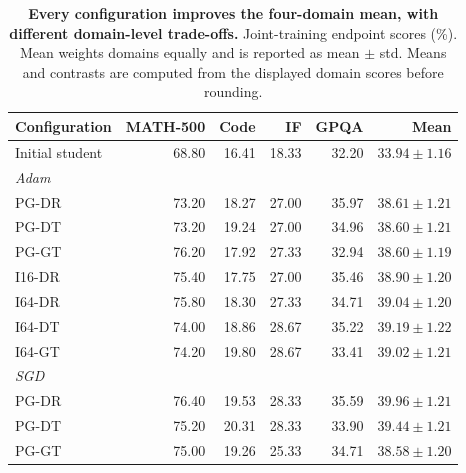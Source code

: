 \begin{table}[t]
\centering
\small
\setlength{\tabcolsep}{5pt}
\caption{\textbf{Every configuration improves the four-domain mean, with different domain-level trade-offs.} Joint-training endpoint scores (\%). Mean weights domains equally and is reported as mean $\pm$ std. Means and contrasts are computed from the displayed domain scores before rounding.}
\label{tab:completed_endpoints}
\begin{tabular}{lrrrrr}
\toprule
Configuration & MATH-500 & Code & IF & GPQA & Mean \\
\midrule
Initial student & 68.80 & 16.41 & 18.33 & 32.20 & $33.94\pm1.16$ \\
\midrule
\multicolumn{6}{l}{\textit{Adam}} \\
PG-DR & 73.20 & 18.27 & 27.00 & 35.97 & $38.61\pm1.21$ \\
PG-DT & 73.20 & 19.24 & 27.00 & 34.96 & $38.60\pm1.21$ \\
PG-GT & 76.20 & 17.92 & 27.33 & 32.94 & $38.60\pm1.19$ \\
I16-DR & 75.40 & 17.75 & 27.00 & 35.46 & $38.90\pm1.20$ \\
I64-DR & 75.80 & 18.30 & 27.33 & 34.71 & $39.04\pm1.20$ \\
I64-DT & 74.00 & 18.86 & 28.67 & 35.22 & $39.19\pm1.22$ \\
I64-GT & 74.20 & 19.80 & 28.67 & 33.41 & $39.02\pm1.21$ \\
\midrule
\multicolumn{6}{l}{\textit{SGD}} \\
PG-DR & 76.40 & 19.53 & 28.33 & 35.59 & $39.96\pm1.21$ \\
PG-DT & 75.20 & 20.31 & 28.33 & 33.90 & $39.44\pm1.21$ \\
PG-GT & 75.00 & 19.26 & 25.33 & 34.71 & $38.58\pm1.20$ \\
\bottomrule
\end{tabular}
\end{table}
